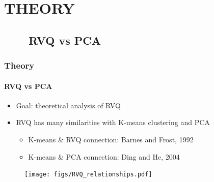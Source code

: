 \begin{frame}[plain]
\begin{columns}
\begin{column}{2.8in}
\begin{figure}
			\end{figure}
			\hspace{-0.2in}
	\end{column}
	\end{columns}
\end{frame}


\section{THEORY}
\subsection{\ \ \ \ RVQ vs PCA}

\begin{frame}
\frametitle{Theory}
\framesubtitle{RVQ vs PCA}
\mypagenum
	\begin{itemize}
		\item {\color{red}Goal}: theoretical analysis of RVQ
		\item RVQ has many similarities with K-means clustering and PCA
			\begin{itemize}
				\item K-means \& RVQ connection: Barnes and Frost, 1992
				\item K-means \& PCA connection: Ding and He, 2004
		\end{itemize}
	\end{itemize}
	\begin{figure}
		\texttt{[image: figs/RVQ\_relationships.pdf]}
	\end{figure}

\end{frame}



